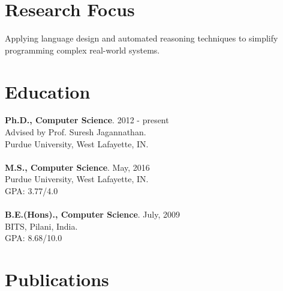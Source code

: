 \documentclass[margin,line]{res}
\begin{document}
 
 
 
\address{https://gowthamk.github.io \hspace{1.35in} gkaki@purdue.edu
          \hspace{1.25in} (201) 417 1775 }

 
\begin{resume} 
 
\section{Research Focus}
Applying language design and automated reasoning techniques to
  simplify programming complex real-world systems.

\section{Education} 
{\bf Ph.D., Computer Science}. \hfill 2012 - present\\
Advised by Prof. Suresh Jagannathan.\\
Purdue University, West Lafayette, IN.\\
\\
{\bf M.S., Computer Science}. \hfill May, 2016\\
Purdue University, West Lafayette, IN.\\
GPA: 3.77/4.0 \\
\\
{\bf B.E.(Hons)., Computer Science}. \hfill July, 2009\\
BITS, Pilani, India.\\
GPA: 8.68/10.0
 

\section{Publications}


\end{resume}
\end{document}
